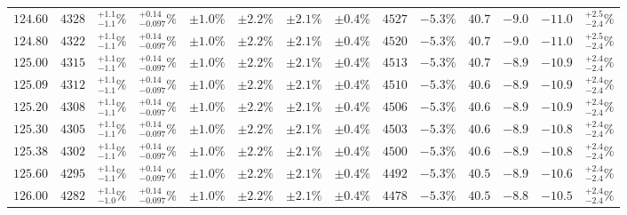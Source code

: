 \begin{landscape}
\begin{table}[ht!]
{\begin{tabular}{| cc | ccc | ccc | ccc | cc | c |}
$124.60$ & $4328$ & $^{+1.1}_{-1.1}\%$ & {\color{black!55}$^{+0.14}_{-0.097}\%$} & {\color{black!55}$\pm 1.0\%$} & $\pm 2.2\%$ & {\color{black!55}$\pm 2.1\%$} & {\color{black!55}$\pm 0.4\%$} & $4527$ & $-5.3\%$ & $40.7$ & $-9.0$ & $-11.0$ & $^{+2.5}_{-2.4}\%$ \\
$124.80$ & $4322$ & $^{+1.1}_{-1.1}\%$ & {\color{black!55}$^{+0.14}_{-0.097}\%$} & {\color{black!55}$\pm 1.0\%$} & $\pm 2.2\%$ & {\color{black!55}$\pm 2.1\%$} & {\color{black!55}$\pm 0.4\%$} & $4520$ & $-5.3\%$ & $40.7$ & $-9.0$ & $-11.0$ & $^{+2.5}_{-2.4}\%$ \\
$125.00$ & $4315$ & $^{+1.1}_{-1.1}\%$ & {\color{black!55}$^{+0.14}_{-0.097}\%$} & {\color{black!55}$\pm 1.0\%$} & $\pm 2.2\%$ & {\color{black!55}$\pm 2.1\%$} & {\color{black!55}$\pm 0.4\%$} & $4513$ & $-5.3\%$ & $40.7$ & $-8.9$ & $-10.9$ & $^{+2.4}_{-2.4}\%$ \\
$125.09$ & $4312$ & $^{+1.1}_{-1.1}\%$ & {\color{black!55}$^{+0.14}_{-0.097}\%$} & {\color{black!55}$\pm 1.0\%$} & $\pm 2.2\%$ & {\color{black!55}$\pm 2.1\%$} & {\color{black!55}$\pm 0.4\%$} & $4510$ & $-5.3\%$ & $40.6$ & $-8.9$ & $-10.9$ & $^{+2.4}_{-2.4}\%$ \\
$125.20$ & $4308$ & $^{+1.1}_{-1.1}\%$ & {\color{black!55}$^{+0.14}_{-0.097}\%$} & {\color{black!55}$\pm 1.0\%$} & $\pm 2.2\%$ & {\color{black!55}$\pm 2.1\%$} & {\color{black!55}$\pm 0.4\%$} & $4506$ & $-5.3\%$ & $40.6$ & $-8.9$ & $-10.9$ & $^{+2.4}_{-2.4}\%$ \\
$125.30$ & $4305$ & $^{+1.1}_{-1.1}\%$ & {\color{black!55}$^{+0.14}_{-0.097}\%$} & {\color{black!55}$\pm 1.0\%$} & $\pm 2.2\%$ & {\color{black!55}$\pm 2.1\%$} & {\color{black!55}$\pm 0.4\%$} & $4503$ & $-5.3\%$ & $40.6$ & $-8.9$ & $-10.8$ & $^{+2.4}_{-2.4}\%$ \\
$125.38$ & $4302$ & $^{+1.1}_{-1.1}\%$ & {\color{black!55}$^{+0.14}_{-0.097}\%$} & {\color{black!55}$\pm 1.0\%$} & $\pm 2.2\%$ & {\color{black!55}$\pm 2.1\%$} & {\color{black!55}$\pm 0.4\%$} & $4500$ & $-5.3\%$ & $40.6$ & $-8.9$ & $-10.8$ & $^{+2.4}_{-2.4}\%$ \\
$125.60$ & $4295$ & $^{+1.1}_{-1.1}\%$ & {\color{black!55}$^{+0.14}_{-0.097}\%$} & {\color{black!55}$\pm 1.0\%$} & $\pm 2.2\%$ & {\color{black!55}$\pm 2.1\%$} & {\color{black!55}$\pm 0.4\%$} & $4492$ & $-5.3\%$ & $40.5$ & $-8.9$ & $-10.6$ & $^{+2.4}_{-2.4}\%$ \\
$126.00$ & $4282$ & $^{+1.1}_{-1.0}\%$ & {\color{black!55}$^{+0.14}_{-0.097}\%$} & {\color{black!55}$\pm 1.0\%$} & $\pm 2.2\%$ & {\color{black!55}$\pm 2.1\%$} & {\color{black!55}$\pm 0.4\%$} & $4478$ & $-5.3\%$ & $40.5$ & $-8.8$ & $-10.5$ & $^{+2.4}_{-2.4}\%$ \\

\end{tabular}}
\end{table}
\end{landscape}
